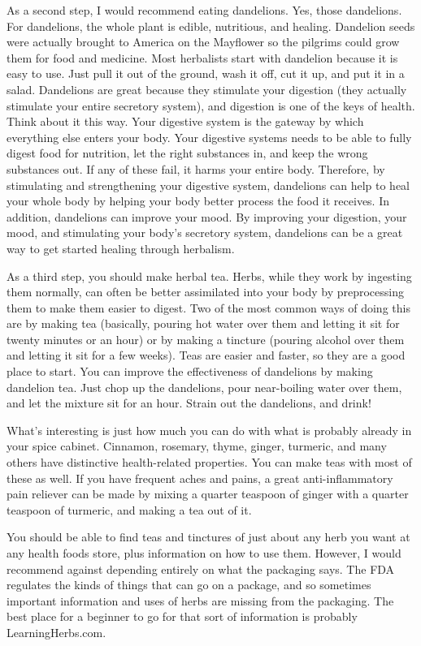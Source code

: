 As a second step, I would recommend eating dandelions. Yes, those
dandelions. For dandelions, the whole plant is edible, nutritious, and
healing.  Dandelion seeds were actually brought to America on the
Mayflower so the pilgrims could grow them for food and medicine.  Most
herbalists start with dandelion because it is easy to use. Just pull it
out of the ground, wash it off, cut it up, and put it in a salad.
Dandelions are great because they stimulate your digestion (they
actually stimulate your entire secretory system), and digestion is one
of the keys of health. Think about it this way. Your digestive system
is the gateway by which everything else enters your body. Your
digestive systems needs to be able to fully digest food for nutrition,
let the right substances in, and keep the wrong substances out. If any
of these fail, it harms your entire body. Therefore, by stimulating and
strengthening your digestive system, dandelions can help to heal your
whole body by helping your body better process the food it receives. In
addition, dandelions can improve your mood. By improving your
digestion, your mood, and stimulating your body's
secretory system, dandelions can be a great way to get started healing
through herbalism.

As a third step, you should make herbal tea. Herbs, while they work by
ingesting them normally, can often be better assimilated into your body
by preprocessing them to make them easier to digest. Two of the most
common ways of doing this are by making tea (basically, pouring hot
water over them and letting it sit for twenty minutes or an hour) or by
making a tincture (pouring alcohol over them and letting it sit for a
few weeks). Teas are easier and faster, so they are a good place to
start. You can improve the effectiveness of dandelions by making
dandelion tea. Just chop up the dandelions, pour near-boiling water
over them, and let the mixture sit for an hour. Strain out the
dandelions, and drink!  

What's interesting is just how much you can do with
what is probably already in your spice cabinet. Cinnamon, rosemary,
thyme, ginger, turmeric, and many others have distinctive
health-related properties. You can make teas with most of these as
well. If you have frequent aches and pains, a great anti-inflammatory
pain reliever can be made by mixing a quarter teaspoon of ginger with a
quarter teaspoon of turmeric, and making a tea out of it.

You should be able to find teas and tinctures of just about any herb
you want at any health
foods store, plus information on how to use them. However, I would
recommend against depending entirely on what the packaging says. The
FDA regulates the kinds of things that can go on a package, and so
sometimes important information and uses of herbs are missing from the
packaging. The best place for a beginner to go for that sort of
information is probably LearningHerbs.com.

